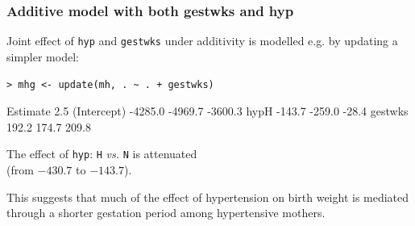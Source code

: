 \documentclass[12pt,dvipsnames,t,handout%
,aspectratio=169%
]{beamer}
\begin{document}
\begin{frame}[fragile]\frametitle{Additive model with both gestwks and hyp}

\bi
\item
Joint effect of
 \texttt{hyp} and \texttt{gestwks} under additivity
 is modelled e.g. by updating a simpler model:

\medskip
\verb|> mhg <- update(mh, . ~ . + gestwks)|
{\small
\begin{semiverbatim}
            Estimate    2.5%
(Intercept)  -4285.0 -4969.7 -3600.3
hypH          -143.7  -259.0   -28.4
gestwks        192.2   174.7   209.8
\end{semiverbatim}
}

\medskip
\item
The effect of {\tt hyp}: {\tt H} {\it vs.} {\tt N}
 is attenuated  \\ (from $-430.7$ to $-143.7$). 
\medskip
\item
This suggests
that much of the effect of hypertension on birth weight is mediated through
a shorter gestation period among hypertensive mothers.
\ei


\end{frame}
\end{document}
